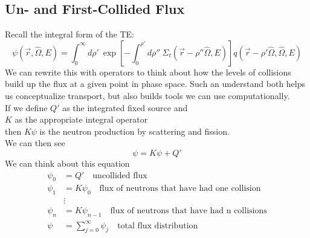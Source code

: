 \documentclass[12pt]{article}
\newcommand{\rvec}{\ensuremath{\vec{r}}}
\newcommand{\vOmega}{\ensuremath{\hat{\Omega}}}
\begin{document}
\subsection*{Un- and First-Collided Flux}
Recall the integral form of the TE:
\begin{equation}
\psi(\rvec, \vOmega, E) =\int_0^{\infty} d\rho' \:\exp[-\int_0^{\rho'} d\rho'' \: \Sigma_t(\rvec-\rho''\vOmega,E)]q(\rvec-\rho'\vOmega,\vOmega,E)
\label{eq:integral}
\end{equation}
%
We can rewrite this with operators to think about how the levels of collisions build up the flux at a given point in phase space. Such an understand both helps us conceptualize transport, but also builds tools we can use computationally.\\
If we define $Q'$ as the integrated fixed source and\\
$K$ as the appropriate integral operator \\
then $K\psi$ is the neutron production by scattering and fission. \\
We can then see
\[\psi = K \psi + Q'\]
We can think about this equation 
\begin{align*}
\psi_0 &= Q' \quad \text{uncollided flux}\\
\psi_1 &= K \psi_0 \quad \text{flux of neutrons that have had one collision}\\
&\vdots \\
\psi_n &= K \psi_{n-1} \quad \text{flux of neutrons that have had n collisions} \\
\psi &= \sum_{j=0}^{\infty} \psi_j \quad \text{total flux distribution}
\end{align*}
\end{document}
